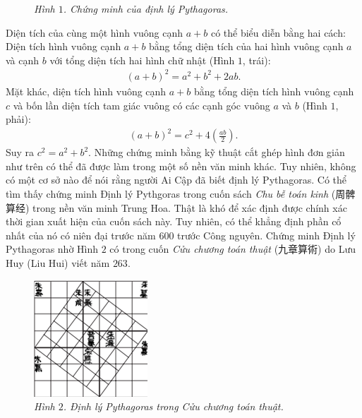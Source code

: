 \begin{multicols}{2}
\begin{figure}[H]
		\caption{\small\textit{\color{lichsutoanhoc}Hình $1$. Chứng minh của định lý Pythagoras.}}
		\vspace*{-10pt}
	\end{figure}
	Diện tích của cùng một hình vuông cạnh $a+b$  có thể biểu diễn bằng hai cách: 
	\vskip 0.1cm
	Diện tích hình vuông cạnh  $a+b$ bằng tổng diện tích của hai hình vuông cạnh $a$ và cạnh $b$  với tổng diện tích hai hình chữ nhật (Hình $1$, trái):
	\begin{align*}
		{\left( {a + b} \right)^2} = {a^2} + {b^2} + 2ab.
	\end{align*}
	Mặt khác, diện tích hình vuông cạnh $a+b$  bằng tổng diện tích hình vuông cạnh $c$  và bốn lần diện tích tam giác vuông có các cạnh góc vuông $a$ và $b$  (Hình $1$, phải):
	\begin{align*}
		{\left( {a + b} \right)^2} = {c^2} + 4\left( {\frac{{ab}}{2}} \right).
	\end{align*}
	Suy ra $c^2 = a^2 + b^2$.
	\vskip 0.1cm 
	Những chứng minh bằng kỹ thuật cắt ghép hình đơn giản như trên có thể đã được làm trong một số nền văn minh khác. Tuy nhiên, không có một cơ sở nào để nói rằng người Ai Cập đã biết định lý Pythagoras.
	\vskip 0.1cm
	Có thể tìm thấy chứng minh Định lý Pythgoras trong cuốn sách \textit{Chu bễ toán kinh} (周髀算经) trong nền văn minh Trung Hoa. Thật là khó để xác định được chính xác thời gian xuất hiện của cuốn sách này. Tuy nhiên, có thể khẳng định phần cổ nhất của nó có niên đại trước năm $600$ trước Công nguyên. Chứng minh Định lý Pythagoras nhờ Hình $2$ có trong cuốn \textit{Cửu chương toán thuật} (九章算術) do Lưu Huy (Liu Hui) viết năm $263$. 
	\begin{figure}[H]
		\vspace*{5pt}
		\centering
		\captionsetup{labelformat= empty, justification=centering}
		\includegraphics[width= 0.5\linewidth]{14}
		\caption{\small\textit{\color{lichsutoanhoc}Hình $2$. Định lý Pythagoras trong Cửu chương toán thuật.}}

\end{figure}
\end{multicols}
